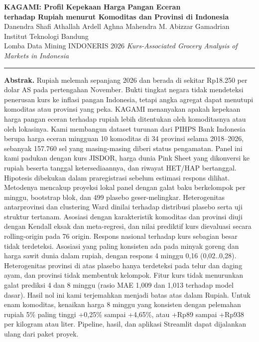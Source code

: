 \documentclass[11pt,a4paper]{article}
\newcommand{\ci}[2]{(#1..#2)}
\begin{document}
\thispagestyle{plain}
\begin{center}
{\LARGE\bfseries\color{kgblue} KAGAMI: Profil Kepekaan Harga Pangan Eceran\\[2pt] terhadap Rupiah menurut Komoditas dan Provinsi di Indonesia}\\[10pt]
{\large Danendra Shafi Athallah \quad Ardell Aghna Mahendra \quad M. Abizzar Gamadrian}\\[3pt]
{\normalsize Institut Teknologi Bandung}\\[2pt]
{\small\color{kggray} Lomba Data Mining INDONERIS 2026 \textperiodcentered{} \textit{Kurs-Associated Grocery Analysis of Markets in Indonesia}}
\end{center}
\vspace{2pt}

\noindent\rule{\textwidth}{0.4pt}
\par\noindent\textbf{Abstrak.}
Rupiah melemah sepanjang 2026 dan berada di sekitar Rp18.250 per dolar AS pada pertengahan November. Bukti tingkat negara
tidak mendeteksi penerusan kurs ke inflasi pangan Indonesia, tetapi angka agregat dapat menutupi komoditas atau provinsi yang peka. KAGAMI menanyakan apakah kepekaan harga pangan eceran terhadap rupiah lebih ditentukan oleh komoditasnya atau oleh lokasinya.
Kami membangun dataset turunan dari PIHPS Bank Indonesia berupa harga eceran mingguan 10 komoditas di 34 provinsi selama
2018–2026, sebanyak 157.760 sel yang masing-masing diberi status pengamatan. Panel ini kami padukan dengan kurs JISDOR, harga dunia
Pink Sheet yang dikonversi ke rupiah beserta tanggal ketersediaannya, dan riwayat HET/HAP bertanggal. Hipotesis dibekukan dalam
praregistrasi sebelum estimasi respons dilihat. Metodenya mencakup proyeksi lokal panel dengan galat baku berkelompok per minggu,
bootstrap blok, dan 499 plasebo geser-melingkar. Heterogenitas antarprovinsi dan clustering Ward dinilai terhadap distribusi
plasebo serta uji struktur tertanam. Asosiasi dengan karakteristik komoditas dan provinsi diuji dengan Kendall eksak dan
meta-regresi, dan nilai prediktif kurs dievaluasi secara rolling-origin pada 76 origin. Respons nasional terhadap kurs sebagian
besar tidak terdeteksi. Asosiasi yang paling konsisten ada pada minyak goreng dan harga sawit dunia dalam rupiah, dengan respons
4 minggu 0,16 \ci{0,02}{0,28}. Heterogenitas provinsi di atas plasebo hanya terdeteksi pada telur dan daging ayam, dan provinsi
tidak membentuk kelompok. Fitur kurs tidak menurunkan galat prediksi 4 dan 8 minggu (rasio MAE 1,009 dan 1,013 terhadap model
dasar). Hasil nol ini kami terjemahkan menjadi batas atas dalam Rupiah. Untuk enam komoditas, kenaikan harga 8 minggu yang
konsisten dengan pelemahan rupiah 5\% paling tinggi +0,25\% sampai +4,65\%, atau +Rp89 sampai +Rp938 per kilogram atau liter.
Pipeline, hasil, dan aplikasi Streamlit dapat dijalankan ulang dari paket proyek.
\end{document}
